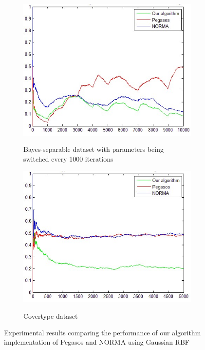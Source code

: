 \begin{figure}[t]
\begin{subfigure}[c]{.45\linewidth}
	   \includegraphics[width=0.9\linewidth]{PN_Switch_Gauss}
\label{SG}
\caption{Bayes-separable dataset with parameters being switched every 1000 iterations}
\end{subfigure}%
\hspace{.01\linewidth}
\begin{subfigure}[c]{.45\linewidth}
	   \includegraphics[width=0.9\linewidth]{PN_Cov_Gauss}
\label{CtG}
\caption{ Covertype dataset}
\end{subfigure}%
    \caption{Experimental results comparing the performance of our algorithm implementation of Pegasos and NORMA using Gaussian RBF}
    \label{Result:GaussPN}
\end{figure}
